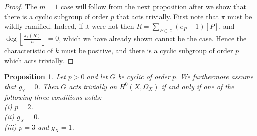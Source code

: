 \documentclass[11pt]{article} %
\newtheorem{prop}{Proposition}
\begin{document}
\begin{proof}
    The $m=1$ case will follow from the next proposition after we show that there is a cyclic subgroup of order $p$ that acts trivially. 
    First note that $\pi$ must be wildly ramified.
    Indeed, if it were not then $R=\sum_{P\in X} (e_P-1)[P]$, and $\deg\left\lfloor \frac{\pi_*(R)}{n} \right\rfloor=0$, which we have already shown cannot be the case.
    Hence the characteristic of $k$ must be positive, and there is a cyclic subgroup of order $p$ which acts trivially.
  \end{proof}

  \begin{prop}
     Let $p  > 0$ and let $G$ be cyclic of order $p$. 
    We furthermore assume that $g_Y = 0$. 
    Then $G$ acts trivially on $H^0(X,\Omega_X)$ if and only if one of the following three conditions holds:\\
      (i) $p=2$.\\
      (ii) $g_X =0$.\\
      (iii) $p=3$ and $g_X=1$.
  \end{prop}
\end{document}

